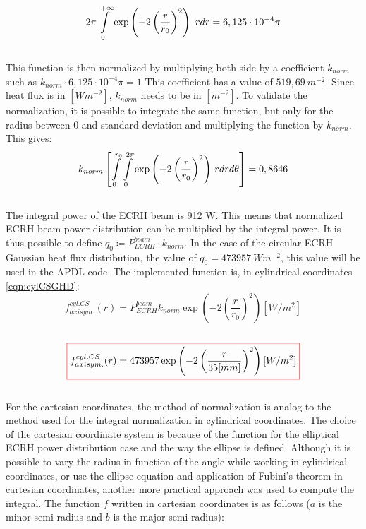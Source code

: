 \\
\begin{equation}
    2 \pi \int\displaylimits_0^{+\infty} \exp\left(-2\left(\frac{r}{r_0}\right)^2 \right) \ rdr = 6,125 \cdot 10^{-4} \pi
\end{equation}
\\
\normalsize{\indent This function is then normalized by multiplying both side by a coefficient $k_{norm}$ such as $k_{norm} \cdot 6,125 \cdot 10^{-4} \pi = 1$ This coefficient has a value of $519,69 \ m^{-2}$. Since heat flux is in $[Wm^{-2}]$, $k_{norm}$ needs to be in $[m^{-2}]$.  To validate the normalization, it is possible to integrate the same function, but only for the radius between 0 and standard deviation and multiplying the function by $k_{norm}$. This gives:}
\\
\begin{equation}
    k_{norm} \left[ \int\displaylimits_0^{r_0} \int\displaylimits_0^{2 \pi} \exp\left(-2\left(\frac{r}{r_0}\right)^2 \right) \,rdrd\theta \right] = 0,8646
\end{equation}
\\
\normalsize{\indent The integral power of the ECRH beam is 912 W. This means that normalized ECRH beam power distribution can be multiplied by the integral power. It is thus possible to define $q_0 \coloneqq P_{ECRH}^{beam} \cdot k_{norm}$. In the case of the circular ECRH Gaussian heat flux distribution, the value of $q_0=473957 \ Wm^{-2}$, this value will be used in the APDL code. The implemented function is, in cylindrical coordinates \eqref{eqn:cylCSGHD}:}
\\
\begin{equation}
    f_{axisym.}^{cyl. CS}(r) = P_{ECRH}^{beam} k_{norm} \exp\left(-2\left(\frac{r}{r_0}\right)^2 \right) [W/m^2]
\end{equation}
\\ 
\begin{equation}
    \color{red}\boxed{\color{black} f_{axisym.}^{cyl. CS}(r) = 473957 \exp\left(-2\left(\frac{r}{35[mm]}\right)^2 \right) [W/m^2]}
    \label{eqn:cylCSGHD}
\end{equation}
\\
\normalsize{\indent For the cartesian coordinates, the method of normalization is analog to the method used for the integral normalization in cylindrical coordinates. The choice of the cartesian coordinate system is because of the function for the elliptical \acrshort{ECRH} power distribution case and the way the ellipse is defined. Although it is possible to vary the radius in function of the angle while working in cylindrical coordinates, or use the ellipse equation and application of Fubini’s theorem in cartesian coordinates, another more practical approach was used to compute the integral. The function $f$ written in cartesian coordinates is as follows ($a$ is the minor semi-radius and $b$ is the major semi-radius):}
